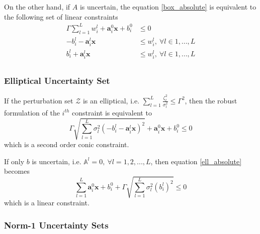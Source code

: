 On the other hand, if $A$ is uncertain, the equation \eqref{box_absolute} is equivalent to the following set of linear constraints
\begin{equation}
    \label{box_linear}
    \begin{split}
        \Gamma \textstyle{\sum}_{l=1}^L w^l_{i} + \mathbf{a}^0_{i}\mathbf{x} + b^0_{i} &\leq 0 \\
        - b^l_{i} - \mathbf{a}^l_{i}\mathbf{x} &\leq w^l_{i},~\forall l \in 1,...,L\\
        b^l_{i} + \mathbf{a}^l_{i}\mathbf{x} &\leq w^l_{i},~\forall l \in 1,...,L\\
    \end{split}
\end{equation}

\subsubsection{Elliptical Uncertainty Set}
If the perturbation set $\mathcal{Z}$ is an elliptical, i.e. $\textstyle{\sum}_{l=1}^L\frac{\zeta_l^2}{\sigma_l^2} \leq \Gamma^2$,
then the robust formulation of the $i^{th}$ constraint is equivalent to
\begin{equation}
    \Gamma \sqrt{\textstyle{\sum}_{l=1}^L \sigma_l^2(- b^l_{i} - \mathbf{a}^l_{i}\mathbf{x})^2} + \mathbf{a}^0_{i}\mathbf{x} + b^0_{i} \leq 0
    \label{ell_absolute}
\end{equation}
which is a second order conic constraint.

If only $b$ is uncertain, i.e. $\mathbb{A}^l = 0,~\forall l = 1,2,...,L$, then equation \eqref{ell_absolute} becomes
\begin{equation}
    \textstyle{\sum}_{l=1}^L \mathbf{a}^0_{i}\mathbf{x} + b^0_{i} + \Gamma \sqrt{\textstyle{\sum}_{l=1}^L \sigma_l^2(b^l_{i})^2} \leq 0
    \label{ell_coeff}
\end{equation}
which is a linear constraint.

\subsubsection{Norm-1 Uncertainty Sets}

